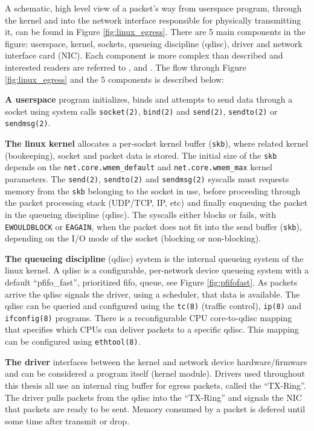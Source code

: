 A schematic, high level view of a packet's way from  userspace program,
through the kernel and into the network interface responsible  for physically
transmitting it, can be found in Figure \ref{fig:linux_egress}.  There are 5
main components in the figure: userspace, kernel, sockets, queueing 
discipline (qdisc), driver and network interface card (NIC). Each component is
more complex than described and interested readers are referred to
\cite{knet}, \cite{pcsending} and \cite[Chapter~17]{ldd}. The flow through
Figure \ref{fig:linux_egress} and the 5 components is described below:

\textbf{A userspace} program initializes, binds and attempts to send
data through a socket using system calls \texttt{socket(2)}, \texttt{bind(2)} 
and \texttt{send(2)}, \texttt{sendto(2)} or \texttt{sendmsg(2)}.

\textbf{The linux kernel} allocates a per-socket kernel buffer
(\texttt{skb}),  where related kernel (bookeeping), socket and packet data is
stored. The initial size of the \texttt{skb} depends on the
\texttt{net.core.wmem\_default} and  \texttt{net.core.wmem\_max} kernel
parameters. The \texttt{send(2)}, \texttt{sendto(2)} and  \texttt{sendmsg(2)}
syscalls must requests memory from the \texttt{skb} belonging to the  socket
in use, before proceeding through the packet processing stack (UDP/TCP, IP,
etc)  and finally enqueuing the packet in the queueing discipline (qdisc). The
syscalls either blocks or fails, with \texttt{EWOULDBLOCK} or \texttt{EAGAIN},
when the  packet does not fit into the send buffer (\texttt{skb}), depending
on the I/O  mode of the socket (blocking or non-blocking).

\textbf{The queueing discipline} (qdisc) system is the internal
queueing system  of the linux kernel. A qdisc is a configurable, per-network
device queueing system with a  default ``pfifo\_fast'', prioritized fifo,
queue, see Figure \ref{fig:pfifofast}. As  packets arrive the qdisc signals
the driver, using a scheduler, that data is available.  The qdisc can be
queried and configured using the \texttt{tc(8)} (traffic control),
\texttt{ip(8)} and \texttt{ifconfig(8)} programs. There is a reconfigurable
CPU core-to-qdisc mapping that specifies which CPUs can deliver packets to
a specific qdisc. This mapping can be configured using \texttt{ethtool(8)}.

\textbf{The driver} interfaces between the kernel and network device
hardware/firmware and can be considered a program itself (kernel module).
Drivers used throughout this thesis all use an internal ring buffer for egress
packets, called the ``TX-Ring''. The driver pulls packets from the qdisc into
the ``TX-Ring'' and signals the NIC that packets are ready to be sent. Memory
consumed by a packet is defered until some time after transmit or drop. 

